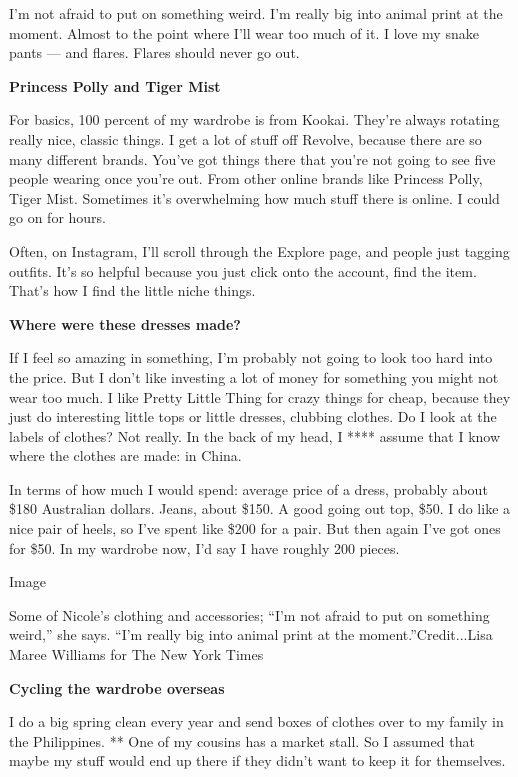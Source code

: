 I'm not afraid to put on something weird. I'm really big into animal
print at the moment. Almost to the point where I'll wear too much of it.
I love my snake pants --- and flares. Flares should never go out.

\textbf{Princess Polly and Tiger Mist}

For basics, 100 percent of my wardrobe is from Kookai. They're always
rotating really nice, classic things. I get a lot of stuff off Revolve,
because there are so many different brands. You've got things there that
you're not going to see five people wearing once you're out. From other
online brands like Princess Polly, Tiger Mist. Sometimes it's
overwhelming how much stuff there is online. I could go on for hours.

Often, on Instagram, I'll scroll through the Explore page, and people
just tagging outfits. It's so helpful because you just click onto the
account, find the item. That's how I find the little niche things.

\textbf{Where were these dresses made?}

If I feel so amazing in something, I'm probably not going to look too
hard into the price. But I don't like investing a lot of money for
something you might not wear too much. I like Pretty Little Thing for
crazy things for cheap, because they just do interesting little tops or
little dresses, clubbing clothes. Do I look at the labels of clothes?
Not really. In the back of my head, I **** assume that I know where the
clothes are made: in China.

In terms of how much I would spend: average price of a dress, probably
about \$180 Australian dollars. Jeans, about \$150. A good going out
top, \$50. I do like a nice pair of heels, so I've spent like \$200 for
a pair. But then again I've got ones for \$50. In my wardrobe now, I'd
say I have roughly 200 pieces.

Image

Some of Nicole's clothing and accessories; ``I'm not afraid to put on
something weird,'' she says. ``I'm really big into animal print at the
moment.''Credit...Lisa Maree Williams for The New York Times

\textbf{Cycling the wardrobe overseas}

I do a big spring clean every year and send boxes of clothes over to my
family in the Philippines. ** One of my cousins has a market stall. So I
assumed that maybe my stuff would end up there if they didn't want to
keep it for themselves.

